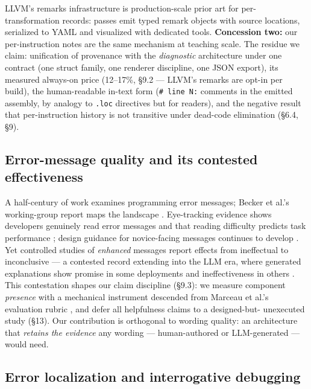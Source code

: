 LLVM's remarks infrastructure \cite{llvm-remarks} is production-scale prior art for
per-transformation records: passes emit typed remark objects with
source locations, serialized to YAML and visualized with dedicated
tools. \textbf{Concession two:} our per-instruction notes are the same
mechanism at teaching scale. The residue we claim: unification of
provenance with the \emph{diagnostic} architecture under one contract
(one struct family, one renderer discipline, one JSON export), its
measured always-on price (12--17\%, \S9.2 --- LLVM's remarks are opt-in
per build), the human-readable in-text form (\texttt{\# line N:} comments in
the emitted assembly, by analogy to \texttt{.loc} directives but for
readers), and the negative result that per-instruction history is
not transitive under dead-code elimination (\S6.4, \S9).

\subsection{Error-message quality and its contested effectiveness}

A half-century of work examines programming error messages; Becker
et al.'s working-group report maps the landscape \cite{becker2019unhelpful}. Eye-tracking
evidence shows developers genuinely read error messages and that
reading difficulty predicts task performance \cite{barik2017developers}; design guidance
for novice-facing messages continues to develop \cite{denny2021designing}. Yet controlled
studies of \emph{enhanced} messages report effects from ineffectual \cite{denny2014enhancing}
to inconclusive \cite{pettit2017enhanced} --- a contested record extending into the LLM era,
where generated explanations show promise in some deployments \cite{taylor2024dcc}
and ineffectiveness in others \cite{santos2024silver}. This contestation shapes our
claim discipline (\S9.3): we measure component \emph{presence} with a
mechanical instrument descended from Marceau et al.'s evaluation
rubric \cite{marceau2011measuring}, and defer all helpfulness claims to a designed-but-
unexecuted study (\S13). Our contribution is orthogonal to wording
quality: an architecture that \emph{retains the evidence} any wording ---
human-authored or LLM-generated \cite{taylor2024dcc} --- would need.

\subsection{Error localization and interrogative debugging}


